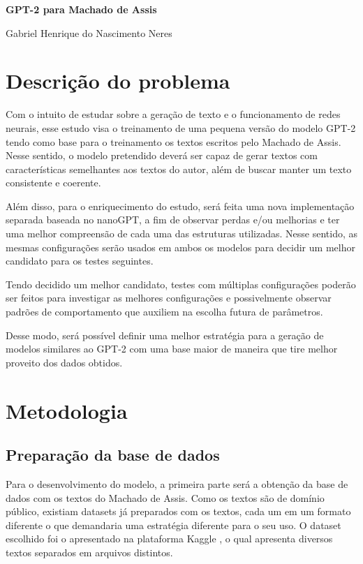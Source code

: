 \documentclass[9pt,technote]{IEEEtran}
\begin{document}
\begin{center}
    \LARGE \textbf{GPT-2 para Machado de Assis}

    \normalsize Gabriel Henrique do Nascimento Neres
\end{center}

\section{Descrição do problema}
Com o intuito de estudar sobre a geração de texto e o funcionamento de redes neurais, esse estudo visa o treinamento de uma pequena versão do modelo GPT-2 tendo como base para o treinamento os textos escritos pelo Machado de Assis. Nesse sentido, o modelo pretendido deverá ser capaz de gerar textos com características semelhantes aos textos do autor, além de buscar manter um texto consistente e coerente.

Além disso, para o enriquecimento do estudo, será feita uma nova implementação separada baseada no nanoGPT, a fim de observar perdas e/ou melhorias e ter uma melhor compreensão de cada uma das estruturas utilizadas. Nesse sentido, as mesmas configurações serão usados em ambos os modelos para decidir um melhor candidato para os testes seguintes.

Tendo decidido um melhor candidato, testes com múltiplas configurações poderão ser feitos para investigar as melhores configurações e possivelmente observar padrões de comportamento que auxiliem na escolha futura de parâmetros.

Desse modo, será possível definir uma melhor estratégia para a geração de modelos similares ao GPT-2 com uma base maior de maneira que tire melhor proveito dos dados obtidos. 

\section{Metodologia}

\subsection{Preparação da base de dados}
Para o desenvolvimento do modelo, a primeira parte será a obtenção da base de dados com os textos do Machado de Assis. Como os textos são de domínio público, existiam datasets já preparados com os textos, cada um em um formato diferente o que demandaria uma estratégia diferente para o seu uso. O dataset escolhido foi o apresentado na plataforma Kaggle \cite{kaggle}, o qual apresenta diversos textos separados em arquivos distintos.
\end{document}
